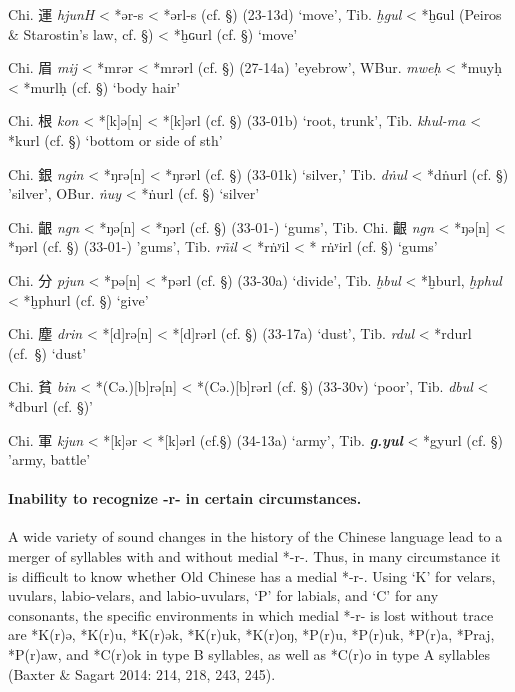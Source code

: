 \begin{description} \item
Chi. 運 \emph{hjunH} \textless{} *{}ər-s \textless{}
*{}ərl-s (cf. §) (23-13d) `move', Tib. {} \emph{ḫgul}
\textless{} *ḫɢul (Peiros \& Starostin's law, cf. §) \textless{} *ḫɢurl
(cf. §) `move'
\item
Chi. 眉 \emph{mij} \textless{} *mrər \textless{} *mrərl (cf. §) (27-14a)
'eyebrow', WBur. {} \emph{mweḥ} \textless{} *muyḥ \textless{} *murlḥ
(cf. §) `body hair'
\item
Chi. 根 \emph{kon} \textless{} *[k]{}ə[n] \textless{}
*[k]{}ərl (cf. §) (33-01b) `root, trunk', Tib. {} \emph{khul-ma}
\textless{} *kurl (cf. §) `bottom or side of sth'
\item
Chi. 銀 \emph{ngin} \textless{} *ŋrə[n] \textless{} *ŋrərl (cf. §)
(33-01k) `silver,' Tib. {} \emph{dṅul} \textless{} *dṅurl (cf. §)
'silver', OBur. {} \emph{ṅuy} \textless{} *ṅurl (cf. §) `silver'
\item
Chi. 齦 \emph{ng{}n} \textless{} *ŋə[n] \textless{} *ŋərl (cf. §)
(33-01-) `gums', Tib. 
Chi. 齦 \emph{ng{}n} \textless{} *ŋə[n] \textless{} *ŋərl (cf. §) (33-01-)
'gums', Tib. {} \emph{rñil} \textless{} *rṅʸil \textless{} * rṅʸirl
(cf. §) `gums'
\item
Chi. 分 \emph{pjun} \textless{} *pə[n] \textless{} *pərl (cf. §)
(33-30a) `divide', Tib. {} \emph{ḫbul }\textless{} *ḫburl, 
{} \emph{ḫphul} \textless{} *ḫphurl (cf. §) `give'
\item
Chi. 塵 \emph{drin} \textless{} *[d]rə[n] \textless{}
*[d]rərl (cf. §) (33-17a) `dust', Tib. {} \emph{rdul} \textless{}
*rdurl (cf.~§) `dust'
\item
Chi. 貧 \emph{bin} \textless{} *(Cə.){[}b]rə[n] \textless{}
*(Cə.){[}b]rərl (cf. §) (33-30v) `poor', Tib. {} \emph{dbul}
\textless{} *dburl (cf. §)'
\item
Chi. 軍 \emph{kjun} \textless{}
*[k]{}ər \textless{} *[k]{}ərl (cf.§) (34-13a) `army', Tib.
 {} \emph{\textbf{g.yul}} \textless{} *gyurl
(cf. §) 'army, battle'
\end{description}

\paragraph{Inability to recognize -r- in
certain circumstances.} A wide variety of sound changes in the
history of the Chinese language lead to a merger of syllables with and
without medial *-r-. Thus, in many circumstance it is difficult to know
whether Old Chinese has a medial *-r-. Using `K' for velars, uvulars,
labio-velars, and labio-uvulars, `P' for labials, and `C' for any
consonants, the specific environments in which medial *-r- is lost
without trace are *K(r)ə, *K(r)u, *K(r)ək, *K(r)uk, *K(r)oŋ, *P(r)u,
*P(r)uk, *P(r)a, *Praj, *P(r)aw, and *C(r)ok in type B syllables, as
well as *C{}(r)o in type A syllables (Baxter \& Sagart 2014: 214, 218,
243, 245).

